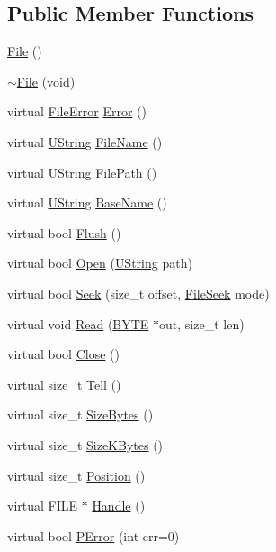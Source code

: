 \subsection*{Public Member Functions}
\begin{DoxyCompactItemize}
\item 
\hyperlink{classVixen_1_1File_a11603af08d0e41ff25a47d5634d19a41}{File} ()
\item 
\hyperlink{classVixen_1_1File_a1079eded77d83b42fcad7db4f3ad98d8}{$\sim$\+File} (void)
\item 
virtual \hyperlink{namespaceVixen_a28cf3e45633036dc0ae46d5ab701af86}{File\+Error} \hyperlink{classVixen_1_1File_a14ec6c12a37a1f60617bbf9313b24d8f}{Error} ()
\item 
virtual \hyperlink{vix__stringutil_8h_a561c282c415a5c38fd9a26325701e3bf}{U\+String} \hyperlink{classVixen_1_1File_a10b0b7cf7ead8a8936aa22cc1f6b9318}{File\+Name} ()
\item 
virtual \hyperlink{vix__stringutil_8h_a561c282c415a5c38fd9a26325701e3bf}{U\+String} \hyperlink{classVixen_1_1File_a2985c6a6cb9a53f6eef0e125e6885051}{File\+Path} ()
\item 
virtual \hyperlink{vix__stringutil_8h_a561c282c415a5c38fd9a26325701e3bf}{U\+String} \hyperlink{classVixen_1_1File_a55e0c906130d29cf5583503016342ddd}{Base\+Name} ()
\item 
virtual bool \hyperlink{classVixen_1_1File_ac3869f8194a442f31d86122dfa8a3837}{Flush} ()
\item 
virtual bool \hyperlink{classVixen_1_1File_a24d43934cc6c607ebba11596c7429595}{Open} (\hyperlink{vix__stringutil_8h_a561c282c415a5c38fd9a26325701e3bf}{U\+String} path)
\item 
virtual bool \hyperlink{classVixen_1_1File_a4def6de72e2f89dc08c1cd1f0c051bad}{Seek} (size\+\_\+t offset, \hyperlink{namespaceVixen_a3819245066e95e1d70b59a549654e606}{File\+Seek} mode)
\item 
virtual void \hyperlink{classVixen_1_1File_a42e051c2575db0c2a594e18c6f650957}{Read} (\hyperlink{vix__platform_8h_a4ae1dab0fb4b072a66584546209e7d58}{B\+Y\+T\+E} $\ast$out, size\+\_\+t len)
\item 
virtual bool \hyperlink{classVixen_1_1File_a3f1848aba4558bd98714c528c3fe0b73}{Close} ()
\item 
virtual size\+\_\+t \hyperlink{classVixen_1_1File_a3071f337ce92a2a8bcb1470cabc1ca87}{Tell} ()
\item 
virtual size\+\_\+t \hyperlink{classVixen_1_1File_a039eb93e24d180e4dd9779c9667242f0}{Size\+Bytes} ()
\item 
virtual size\+\_\+t \hyperlink{classVixen_1_1File_a5d5bbcc901aacfaeba1c034eedb791df}{Size\+K\+Bytes} ()
\item 
virtual size\+\_\+t \hyperlink{classVixen_1_1File_acdc342b07d6d1f7b11d5b0edcb573ddc}{Position} ()
\item 
virtual F\+I\+L\+E $\ast$ \hyperlink{classVixen_1_1File_a03d0e61e3fe875360cce0bdd639b2893}{Handle} ()
\item 
virtual bool \hyperlink{classVixen_1_1File_a3d03ec3abc2fe10164dead567725fa1f}{P\+Error} (int err=0)
\end{DoxyCompactItemize}
